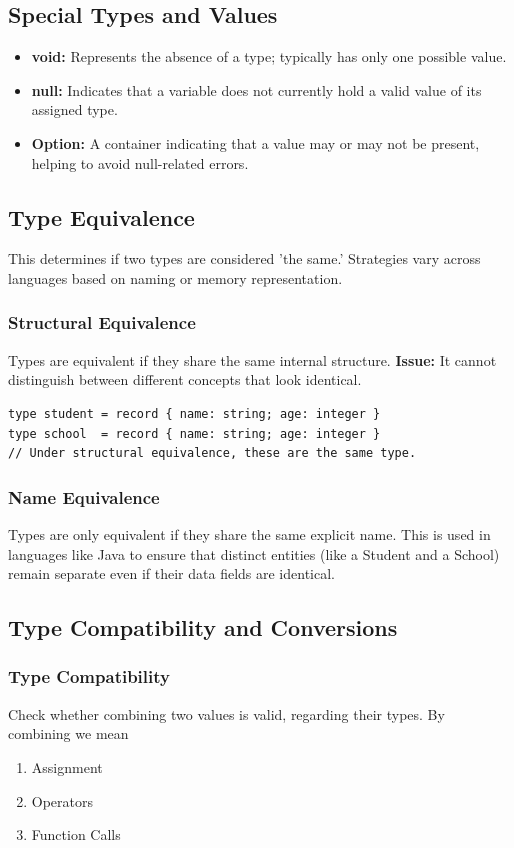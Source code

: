 \documentclass{article}
\begin{document}
\subsection{Special Types and Values}
\begin{itemize}
    \item \textbf{void:} Represents the absence of a type; typically has only one possible value.
    \item \textbf{null:} Indicates that a variable does not currently hold a valid value of its assigned type.
    \item \textbf{Option:} A container indicating that a value may or may not be present, helping to avoid null-related errors.
\end{itemize}

\subsection{Type Equivalence}
This determines if two types are considered 'the same.' Strategies vary across languages based on naming or memory representation.

\subsubsection{Structural Equivalence}
Types are equivalent if they share the same internal structure. 
\textbf{Issue:} It cannot distinguish between different concepts that look identical.
\begin{lstlisting}
type student = record { name: string; age: integer }
type school  = record { name: string; age: integer }
// Under structural equivalence, these are the same type.
\end{lstlisting}

\subsubsection{Name Equivalence}
Types are only equivalent if they share the same explicit name. This is used in languages like Java to ensure that distinct entities (like a Student and a School) remain separate even if their data fields are identical.

\subsection{Type Compatibility and Conversions}
\subsubsection{Type Compatibility}
Check whether combining two values is valid, regarding their types. By combining we mean
\begin{enumerate}
  \item Assignment
  \item Operators
  \item Function Calls
\end{enumerate}
\end{document}
